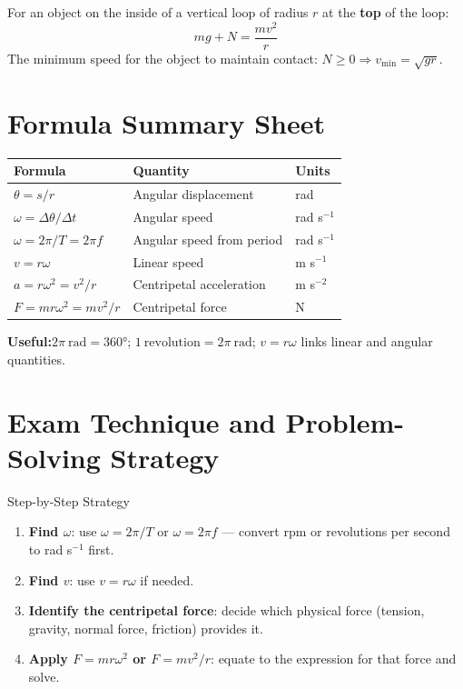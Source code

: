 For an object on the inside of a vertical loop of radius $r$ at the \textbf{top} of the loop:
$$mg + N = \frac{mv^2}{r}$$
The minimum speed for the object to maintain contact: $N \geq 0 \Rightarrow v_{\min} = \sqrt{gr}$.

\section{Formula Summary Sheet}

\begin{minipage}{\linewidth}
\begin{tcolorbox}[colback=lightgold, colframe=accentgold]
\renewcommand{\arraystretch}{1.8}
\begin{tabular}{@{}lll@{}}
\toprule
\textbf{Formula} & \textbf{Quantity} & \textbf{Units} \\
\midrule
$\theta = s/r$ & Angular displacement & rad \\
$\omega = \Delta\theta/\Delta t$ & Angular speed & rad s$^{-1}$ \\
$\omega = 2\pi/T = 2\pi f$ & Angular speed from period & rad s$^{-1}$ \\
$v = r\omega$ & Linear speed & m s$^{-1}$ \\
$a = r\omega^2 = v^2/r$ & Centripetal acceleration & m s$^{-2}$ \\
$F = mr\omega^2 = mv^2/r$ & Centripetal force & N \\
\bottomrule
\end{tabular}
\end{tcolorbox}

\vspace{0.5em}
\begin{tcolorbox}[colback=lightblue, colframe=darkblue]
\textbf{Useful:}\quad $2\pi\ \text{rad} = 360°$;\quad
$1\ \text{revolution} = 2\pi\ \text{rad}$;\quad
$v = r\omega$ links linear and angular quantities.
\end{tcolorbox}
\end{minipage}

\section{Exam Technique and Problem-Solving Strategy}

\begin{keybox}{Step-by-Step Strategy}
\begin{enumerate}[itemsep=3pt]
  \item \textbf{Find $\omega$}: use $\omega = 2\pi/T$ or $\omega = 2\pi f$ — convert rpm or revolutions per second to rad s$^{-1}$ first.
  \item \textbf{Find $v$}: use $v = r\omega$ if needed.
  \item \textbf{Identify the centripetal force}: decide which physical force (tension, gravity, normal force, friction) provides it.
  \item \textbf{Apply $F = mr\omega^2$ or $F = mv^2/r$}: equate to the expression for that force and solve.
\end{enumerate}
\end{keybox}

